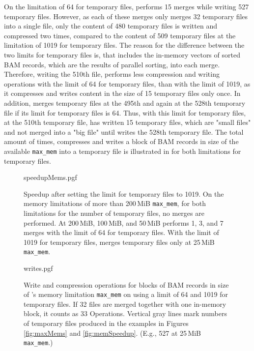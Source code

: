 On the limitation of 64 for temporary files, \sort performs 15 merges while writing 527 temporary files. However, as each of these merges only merges 32 temporary files into a single file, only the content of 480 temporary files is written and compressed two times, compared to the content of 509 temporary files at the limitation of 1019 for temporary files. The reason for the difference between the two limits for temporary files is, that \sort includes the in-memory vectors of sorted BAM records, which are the results of parallel sorting, into each merge. Therefore, writing the 510th file, \sort performs less compression and writing operations with the limit of 64 for temporary files, than with the limit of 1019, as it compresses and writes content in the size of 15 temporary files only once. In addition, \sort merges temporary files at the 495th and again at the 528th temporary file if its limit for temporary files is 64. Thus, with this limit for temporary files, at the 510th temporary file, \sort has written 15 temporary files, which are "small files" and not merged into a "big file" until \sort writes the 528th temporary file. The total amount of times, \sort compresses and writes a block of BAM records in size of the available \texttt{max\_mem} into a temporary file is illustrated in  for both limitations for temporary files.

\begin{figure}
        {speedupMems.pgf}
    \caption{Speedup after setting the limit for temporary files to 1019. On the memory limitations of more than 200\,MiB \texttt{max\_mem}, for both limitations for the number of temporary files, no merges are performed. At 200\,MiB, 100\,MiB, and 50\,MiB \sort performs 1, 3, and 7 merges with the limit of 64 for temporary files. With the limit of 1019 for temporary files, \sort merges temporary files only at 25\,MiB \texttt{max\_mem}. \points}
    \label{fig:memSpeedup}
    \bigskip
        {writes.pgf}
    \caption{
    Write and compression operations for blocks of BAM records in size of \sort's memory limitation \texttt{max\_mem} on using a limit of 64 and 1019 for temporary files. If 32 files are merged together with one in-memory block, it counts as 33 Operations. Vertical gray lines mark numbers of temporary files produced in the examples in Figures \ref{fig:maxMems} and \ref{fig:memSpeedup}. (E.g., 527 at 25\,MiB \texttt{max\_mem}.)
    }
    \label{fig:writes}
\end{figure}

